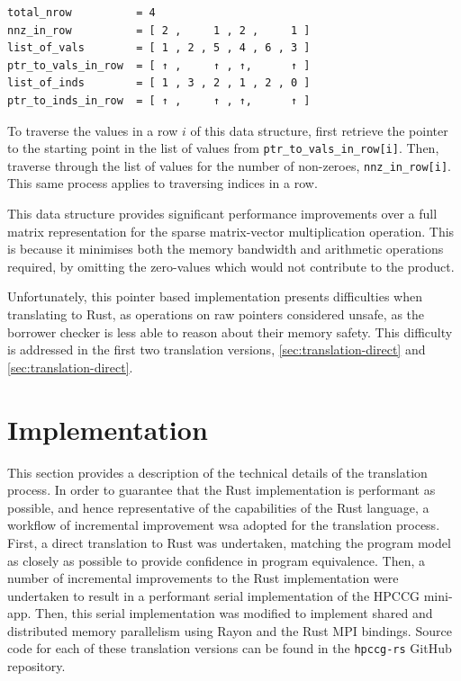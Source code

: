 \begin{verbatim}
total_nrow          = 4
nnz_in_row          = [ 2 ,     1 , 2 ,     1 ]
list_of_vals        = [ 1 , 2 , 5 , 4 , 6 , 3 ]
ptr_to_vals_in_row  = [ ↑ ,     ↑ , ↑,      ↑ ]
list_of_inds        = [ 1 , 3 , 2 , 1 , 2 , 0 ]
ptr_to_inds_in_row  = [ ↑ ,     ↑ , ↑,      ↑ ]
\end{verbatim}

To traverse the values in a row $i$ of this data structure, first retrieve the pointer to the starting point in the list of values from \texttt{ptr\_to\_vals\_in\_row[i]}. Then, traverse through the list of values for the number of non-zeroes, \texttt{nnz\_in\_row[i]}. This same process applies to traversing indices in a row.

This data structure provides significant performance improvements over a full matrix representation for the sparse matrix-vector multiplication operation. This is because it minimises both the memory bandwidth and arithmetic operations required, by omitting the zero-values which would not contribute to the product.

Unfortunately, this pointer based implementation presents difficulties when translating to Rust, as operations on raw pointers considered unsafe, as the borrower checker is less able to reason about their memory safety. This difficulty is addressed in the first two translation versions, \ref{sec:translation-direct} and \ref{sec:translation-direct}.


\section{Implementation}
\label{sec:translation-implementation} %

This section provides a description of the technical details of the translation process. In order to guarantee that the Rust implementation is performant as possible, and hence representative of the capabilities of the Rust language, a workflow of incremental improvement wsa adopted for the translation process. First, a direct translation to Rust was undertaken, matching the program model as closely as possible to provide confidence in program equivalence. Then, a number of incremental improvements to the Rust implementation were undertaken to result in a performant serial implementation of the HPCCG mini-app. Then, this serial implementation was modified to implement shared and distributed memory parallelism using Rayon and the Rust MPI bindings. Source code for each of these translation versions can be found in the \texttt{hpccg-rs} GitHub repository.


